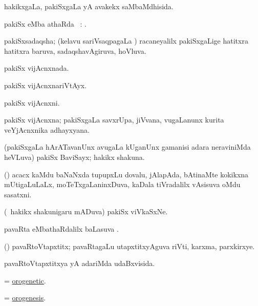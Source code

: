 \bentry
{}
\gl{\gu}
\bmng
hakikxgaLa, pakiSxgaLa yA avakekx saMbaMdhisida. 
\emng
\eentry

\bentry
{}
\gl{\sapUpa}
\bmng
pakiSx eMba athaRda \sapUpa\ : . 
\emng
\eentry

\bentry
{}
\gl{\gu}
\bmng
pakiSxsadaqsha; (kelavu sariVsaqpagaLa \vi) racaneyalilx pakiSxgaLige hatitxra hatitxra baruva, sadaqshavAgiruva, hoVluva. 
\emng
\eentry

\bentry
{}
\gl{\gu}
\bmng
pakiSx vijAcnxnada. 
\emng
\eentry

\bentry
{}
\gl{\kirxvi}
\bmng
pakiSx vijAcnxnariVtAyx. 
\emng
\eentry

\bentry
{}
\gl{\nA}
\bmng
pakiSx vijAcnxni. 
\emng
\eentry

\bentry
{}
\gl{\nA}
\bmng
pakiSx vijAcnxna; pakiSxgaLa savxrUpa, jiVvana, \mo vugaLanunx kurita veYjAcnxnika adhayxyana. 
\emng
\eentry

\bentry
{}
\gl{\nA}
\bmng
(pakiSxgaLa hArATavanUnx avugaLa kUganUnx gamanisi adara neraviniMda heVLuva) pakiSx BaviSayx; hakikx shakuna. 
\emng
\eentry

\bentry
{}
\gl{\nA}
\bmng
(\AseTxrXV) acacx kaMdu baNaNxda tupupxLu dovalu, jAlapAda, bAtinaMte kokikxna mUtigaLuLaLx, moTeTxgaLaninxDuva, kaDala tiVradalilx vAsisuva oMdu sasatxni. 
\emng
\eentry

\bentry
{}
\gl{\nA}
\bmng
(\kanmu\ hakikx shakunigaru mADuva) pakiSx viVkaSxNe. 
\emng
\eentry

\bentry
{}
\gl{\sapUpa}
\bmng
pavaRta eMbathaRdalilx baLasuva \sapUpa. 
\emng
\eentry

\bentry
{}
\gl{\nA}
\bmng
(\BUvi) pavaRtoVtapxtitx; pavaRtagaLu utapxtitxyAguva riVti, karxma, parxkirxye. 
\emng
\eentry

\bentry
{}
\gl{\gu}
\bmng
pavaRtoVtapxtitxya yA adariMda udaBxvisida. 
\emng
\eentry

\bentry
{}
\gl{\gu}
\bmng
= \hyperlink{orogenetic}{orogenetic}. 
\emng
\eentry

\bentry
{}
\gl{\nA}
\bmng
= \hyperlink{orogenesis}{orogenesis}. 
\emng
\eentry

